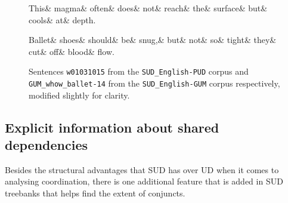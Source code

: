 \begin{figure}
\begin{exe}
    \ex
    \label{ex:SUD magma}
    \begin{dependency}[hide label, baseline=-\the\dimexpr\fontdimen22\textfont2\relax]
	\begin{deptext}
		 This\& magma\& often\& does\& not\& reach\& the\& surface\& but\& cools\& at\& depth.\\
	 \end{deptext} 
\end{dependency}
\end{exe}

\begin{exe}
    \ex
    \label{ex:SUD ballet}
    \begin{dependency}[hide label, baseline=-\the\dimexpr\fontdimen22\textfont2\relax]
        \begin{deptext}
            Ballet\& shoes\& should\& be\& snug,\& but\& not\& so\& tight\& they\& cut\& off\& blood\& flow.\\
        \end{deptext}
    \end{dependency}
\end{exe}
\caption{Sentences \texttt{w01031015} from the \texttt{SUD\_English-PUD} corpus and \texttt{GUM\_whow\_ballet-14} from the \texttt{SUD\_English-GUM} corpus respectively, modified slightly for clarity.}
\end{figure}

\subsection{Explicit information about shared dependencies}
Besides the structural advantages that SUD has over UD when it comes to analysing coordination, there is one additional feature that is added in SUD treebanks that helps find the extent of conjuncts. 

